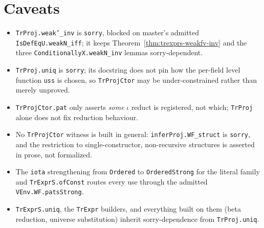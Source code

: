 \section*{Caveats}
\begin{itemize}
\item \texttt{TrProj.weak'\_inv} is \texttt{sorry}, blocked on master's admitted \texttt{IsDefEqU.weakN\_iff}; it keeps Theorem~\ref{thm:trexprs-weakfv-inv} and the three \texttt{ConditionallyX.weakN\_inv} lemmas sorry-dependent.
\item \texttt{TrProj.uniq} is \texttt{sorry}; its docstring does not pin how the per-field level function \texttt{uss} is chosen, so \texttt{TrProjCtor} may be under-constrained rather than merely unproved.
\item \texttt{TrProjCtor.pat} only asserts \emph{some} $\iota$ reduct is registered, not which; \texttt{TrProj} alone does not fix reduction behaviour.
\item No \texttt{TrProjCtor} witness is built in general: \texttt{inferProj.WF\_struct} is \texttt{sorry}, and the restriction to single-constructor, non-recursive structures is asserted in prose, not formalized.
\item The \texttt{iota} strengthening from \texttt{Ordered} to \texttt{OrderedStrong} for the literal family and \texttt{TrExprS.ofConst} routes every use through the admitted \texttt{VEnv.WF.patsStrong}.
\item \texttt{TrExprS.uniq}, the \texttt{TrExpr} builders, and everything built on them (beta reduction, universe substitution) inherit sorry-dependence from \texttt{TrProj.uniq}.
\end{itemize}
